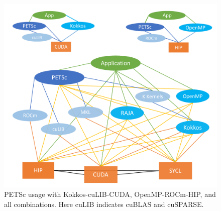 \documentclass[10pt,journal,compsoc]{IEEEtran}
\begin{document}

\begin{figure}[htbp]
\begin{center}
\includegraphics[clip,width=.99\linewidth]{PETSc-backends-all.pdf}
\caption{PETSc usage with Kokkos-cuLIB-CUDA, OpenMP-ROCm-HIP, and all combinations. Here cuLIB indicates cuBLAS and cuSPARSE.}
\label{fig:petsc_backends}
\end{center}
\end{figure}
\end{document}
